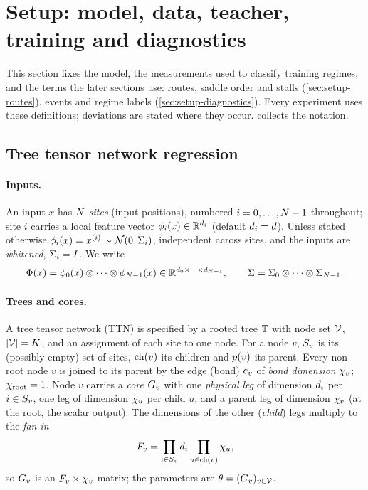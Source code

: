 \section{Setup: model, data, teacher, training and diagnostics}\label{sec:setup}

This section fixes the model, the measurements used to classify training regimes, and the terms
the later sections use: routes, saddle order and stalls (\cref{sec:setup-routes}), events and regime
labels (\cref{sec:setup-diagnostics}). Every experiment uses these definitions; deviations are stated
where they occur.  collects the notation.

\subsection{Tree tensor network regression}\label{sec:setup-model}

\paragraph{Inputs.}
An input $x$ has $\Ns$ \emph{sites} (input positions), numbered $i=0,\dots,\Ns-1$ throughout; site $i$
carries a local feature vector $\feat{i}(x)\in\R^{\pd[i]}$ (default $\pd[i]=d$). Unless stated
otherwise $\feat{i}(x)=\xs{i}\sim\Normal(0,\Sigi{i})$, independent across sites, and the inputs are
\emph{whitened}, $\Sigi{i}=\Id$. We write
\begin{equation*}
  \Feat(x)=\feat{0}(x)\otimes\dots\otimes\feat{\Ns-1}(x)\in\R^{\pd[0]\times\dots\times\pd[\Ns-1]},
  \qquad
  \Sig=\Sigi{0}\otimes\dots\otimes\Sigi{\Ns-1}.
\end{equation*}

\paragraph{Trees and cores.}
A tree tensor network (TTN) is specified by a rooted tree $\tree$ with node set $\nodes$,
$\abs{\nodes}=\Kc$, and an assignment of each site to one node. For a node $v$, $\sites{v}$ is its
(possibly empty) set of sites, $\ch{v}$ its children and $\pa{v}$ its parent. Every non-root node $v$
is joined to its parent by the edge (bond) $\edge{v}$ of \emph{bond dimension} $\bd{v}$;
$\bd{\vroot}=1$. Node $v$ carries a \emph{core} $\G{v}$ with one \emph{physical leg} of dimension
$\pd[i]$ per $i\in\sites{v}$, one leg of dimension $\bd{u}$ per child $u$, and a parent leg of
dimension $\bd{v}$ (at the root, the scalar output). The dimensions of the other (\emph{child}) legs
multiply to the \emph{fan-in}
\begin{equation*}
  \fanin{v}=\prod_{i\in\sites{v}}\pd[i]\prod_{u\in\ch{v}}\bd{u},
\end{equation*}
so $\G{v}$ is an $\fanin{v}\times\bd{v}$ matrix; the parameters are $\params=(\G{v})_{v\in\nodes}$.

